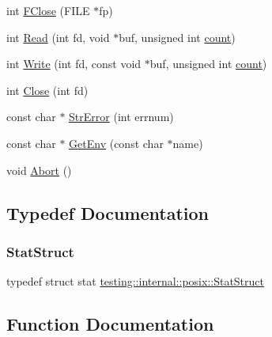 \begin{DoxyCompactItemize}
\item 
int \hyperlink{namespacetesting_1_1internal_1_1posix_af4beeaaa8d62916d5e3b644a1ddfbd6b}{F\+Close} (F\+I\+LE $\ast$fp)
\item 
int \hyperlink{namespacetesting_1_1internal_1_1posix_a3c6ab13e581a56f1b02f3eb7536c97fd}{Read} (int fd, void $\ast$buf, unsigned int \hyperlink{gmock__stress__test_8cc_afd9db40e3361ae09188795e8cbe19752}{count})
\item 
int \hyperlink{namespacetesting_1_1internal_1_1posix_af4acf9f78d55f815a18b43786511abef}{Write} (int fd, const void $\ast$buf, unsigned int \hyperlink{gmock__stress__test_8cc_afd9db40e3361ae09188795e8cbe19752}{count})
\item 
int \hyperlink{namespacetesting_1_1internal_1_1posix_a15e5b8f2a535ef1b2529b85b861e4846}{Close} (int fd)
\item 
const char $\ast$ \hyperlink{namespacetesting_1_1internal_1_1posix_a4b77b14af6f4d18f83d303b98e9349c4}{Str\+Error} (int errnum)
\item 
const char $\ast$ \hyperlink{namespacetesting_1_1internal_1_1posix_a1d5e3da5a27eed25986859fa83cafe95}{Get\+Env} (const char $\ast$name)
\item 
void \hyperlink{namespacetesting_1_1internal_1_1posix_a69b8278c59359dd6a6f941b4643db9fb}{Abort} ()
\end{DoxyCompactItemize}


\subsection{Typedef Documentation}
\mbox{\label{namespacetesting_1_1internal_1_1posix_a8eb9f08d3af29941c2d2a964cfff3ecb}} 
\subsubsection{\texorpdfstring{Stat\+Struct}{StatStruct}}
{\footnotesize\ttfamily typedef struct stat \hyperlink{namespacetesting_1_1internal_1_1posix_a8eb9f08d3af29941c2d2a964cfff3ecb}{testing\+::internal\+::posix\+::\+Stat\+Struct}}



\subsection{Function Documentation}
\mbox{\label{namespacetesting_1_1internal_1_1posix_a69b8278c59359dd6a6f941b4643db9fb}} 
